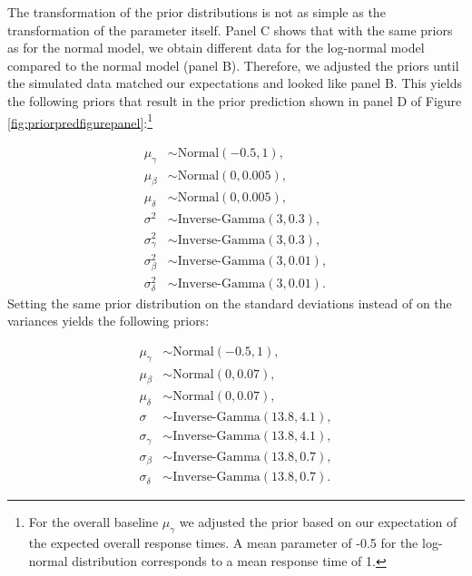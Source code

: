 \documentclass[
  english,
  doc,floatsintext]{apa6}
\begin{document}
The transformation of the prior distributions is not as simple as the transformation of the parameter itself. Panel C shows that with the same priors as for the normal model, we obtain different data for the log-normal model compared to the normal model (panel B). Therefore, we adjusted the priors until the simulated data matched our expectations and looked like panel B. This yields the following priors that result in the prior prediction shown in panel D of Figure \ref{fig:priorpredfigurepanel}:\footnote{For the overall baseline \(\mu_\gamma\) we adjusted the prior based on our expectation of the expected overall response times. A mean parameter of -0.5 for the log-normal distribution corresponds to a mean response time of 1.}

\begin{equation}
\begin{aligned}
\mu_{\gamma} &\sim \text{Normal}(-0.5, 1), \label{eq:chosenpriorslogvar} \\
\mu_{\beta} &\sim \text{Normal}(0, 0.005), \\
\mu_{\delta} &\sim \text{Normal}(0, 0.005), \\
\sigma^2 &\sim \text{Inverse-Gamma}(3, 0.3),  \\
\sigma^2_{\gamma} &\sim \text{Inverse-Gamma}(3, 0.3), \\   
\sigma^2_{\beta} &\sim \text{Inverse-Gamma}(3, 0.01), \\   
\sigma^2_{\delta} &\sim \text{Inverse-Gamma}(3, 0.01).    
\end{aligned}
\end{equation}
Setting the same prior distribution on the standard deviations instead of on the variances yields the following priors:

\begin{equation}
\begin{aligned}
\mu_{\gamma} &\sim \text{Normal}(-0.5, 1), \label{eq:chosenpriorslogsd} \\
\mu_{\beta} &\sim \text{Normal}(0, 0.07), \\
\mu_{\delta} &\sim \text{Normal}(0, 0.07), \\
\sigma &\sim \text{Inverse-Gamma}(13.8, 4.1),  \\
\sigma_{\gamma} &\sim \text{Inverse-Gamma}(13.8, 4.1), \\   
\sigma_{\beta} &\sim \text{Inverse-Gamma}(13.8, 0.7), \\   
\sigma_{\delta} &\sim \text{Inverse-Gamma}(13.8, 0.7).    
\end{aligned}
\end{equation}
\end{document}
